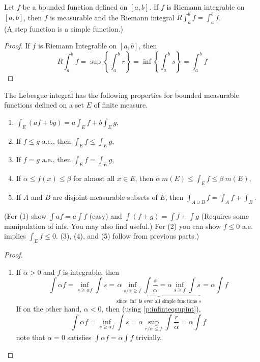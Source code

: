 \pagebreak
\begin{pblm}%
	Let $f$ be a bounded function defined on $[a,b]$. If $f$ is Riemann integrable 
	on $[a,b]$, then $f$ is measurable and the Riemann integral $R\int_a^b f =\int_a^b f$. \\
	(A step function is a simple function.)
\begin{proof}
	If $f$ is Riemann Integrable on $[a,b]$, then 
	\begin{equation*}
		R\int_a^b f = \sup\left\{\int_a^b r\right\} = \inf\left\{\int_a^b s \right\} = \int_a^b f
	\end{equation*}
\end{proof}
\end{pblm}

\begin{pblm}\label{p:lebesguelotsofuseful}%
	The Lebesgue integral has the following properties for bounded measurable functions defined 
	on a set $E$ of finite measure. 
	\begin{enumerate}
	\item $\int_E (af + bg) = a\int_E f + b\int_E g$, 
	\item If $f \le g$ a.e., then $\int_E f \le \int_E g$, 
	\item If $f = g$ a.e., then $\int_E f = \int_E g$, 
	\item If $\alpha \le f(x) \le \beta$ for almost all $x \in E$, then 
		$\alpha ~m(E) \le \int_E f \le \beta~ m(E)$, 
	\item If $A$ and $B$ are disjoint measurable subsets of $E$, then 
		$\int_{A\cup B} f = \int_A f + \int_B$. 
	\end{enumerate}
	{\scriptsize{(For (1) show $\int af = a\int f$ (easy) and $\int(f+g) = \int f + \int g$ (Requires some 
	manipulation of infs. You may also find  useful.) For (2) you can 
	show $f \le 0$ a.e. implies $\int_E f \le 0.$ (3), (4), and (5) follow from previous parts.)}}
\begin{proof}
~
\begin{enumerate}
	\item If $\alpha > 0$ and $f$ is integrable, then 
		\begin{equation*}
			\int \alpha f = \inf\limits_{s\ge\alpha f} \int s = 
			\underbrace{\alpha \inf\limits_{s/\alpha \ge f}\int \frac{s}{\alpha} = 
				    \alpha \inf\limits_{s\ge f} \int s}_
					{\text{since }\inf\text{ is over all simple functions }s} = 
			\alpha \int f
		\end{equation*}
		If on the other hand, $\alpha < 0$, then (using \ref{p:infinteqsupint}), 
		\begin{equation*}
			\int \alpha f = \inf\limits_{s\ge\alpha f} \int s = 
			\alpha \sup\limits_{r/\alpha\le f}\int \frac{r}{\alpha} = 
			\alpha \int f
		\end{equation*}
		note that $\alpha = 0$ satisfies $\int \alpha f = \alpha \int f$ trivially. 


\end{enumerate}
\end{proof}
\end{pblm}
